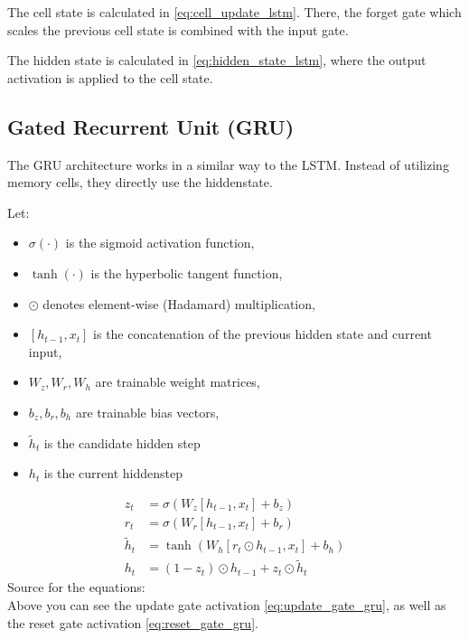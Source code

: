 \documentclass{article}
\begin{document}
The cell state is calculated in \eqref{eq:cell_update_lstm}. There, the forget 
gate which scales the previous cell state is combined with the input gate.

The hidden state is calculated in \eqref{eq:hidden_state_lstm}, where the output 
activation is applied to the cell state.

\subsection{Gated Recurrent Unit (GRU)}

The GRU architecture works in a similar way to the LSTM. Instead of utilizing 
memory cells, they directly use the hiddenstate.

Let:
\begin{itemize}
    \item $\sigma(\cdot)$ is the sigmoid activation function,
    \item $\tanh(\cdot)$ is the hyperbolic tangent function,
    \item $\odot$ denotes element-wise (Hadamard) multiplication,
    \item $[h_{t-1}, x_t]$ is the concatenation of the previous hidden state and current input,
    \item $W_z, W_r, W_h$ are trainable weight matrices,
    \item $b_z, b_r, b_h$ are trainable bias vectors,
    \item $\tilde{h}_t$ is the candidate hidden step
    \item $h_t$ is the current hiddenstep
\end{itemize}

\begin{align}
    z_t &= \sigma\!\left(W_z [h_{t-1}, x_t] + b_z\right) \label{eq:update_gate_gru} \\
    r_t &= \sigma\!\left(W_r [h_{t-1}, x_t] + b_r\right) \label{eq:reset_gate_gru} \\
    \tilde{h}_t &= \tanh\!\left(W_h [r_t \odot h_{t-1}, x_t] + b_h\right) \label{eq:candidate_hidden_state_gru} \\
    h_t &= (1 - z_t) \odot h_{t-1} + z_t \odot \tilde{h}_t \label{eq:update_hidden_state_gru}
\end{align}
Source for the equations: \cite{geeksforgeeks_gru}
\\[2em]
Above you can see the update gate activation \eqref{eq:update_gate_gru}, as well 
as the reset gate activation \eqref{eq:reset_gate_gru}.
\end{document}
